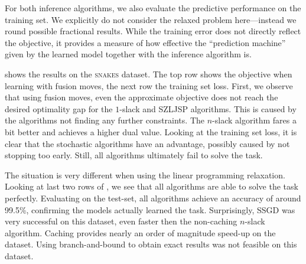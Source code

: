 For both inference algorithms, we also evaluate the predictive performance on
the training set.  We explicitly do not consider the relaxed problem
here---instead we round possible fractional results. While the training error
does not directly reflect the objective, it provides a measure of how effective
the ``prediction machine'' given by the learned model together with the
inference algorithm is.

 shows the results on the \textsc{snakes} dataset.
The top row shows the objective when learning with fusion moves, the next row
the training set loss.  First, we observe that using fusion moves, even the
approximate objective does not reach the desired optimality gap for the
$1$-slack and SZLJSP algorithms. This is caused by the algorithms not finding
any further constraints. The $n$-slack algorithm fares a bit better and
achieves a higher dual value. Looking at the training set loss, it is clear that the stochastic
algorithms have an advantage, possibly caused by not stopping too early.
Still, all algorithms ultimately fail to solve the task.

The situation is very different when using the linear programming relaxation.
Looking at last two rows of , we see that all
algorithms are able to solve the task perfectly. Evaluating on the test-set, all algorithms
achieve an accuracy of around 99.5\%, confirming the models actually learned the task.
Surprisingly, SSGD was very successful on this dataset, even faster then the non-caching $n$-slack
algorithm. Caching provides nearly an order of magnitude speed-up on the dataset.
%
Using branch-and-bound to obtain exact results was not feasible on this dataset.

